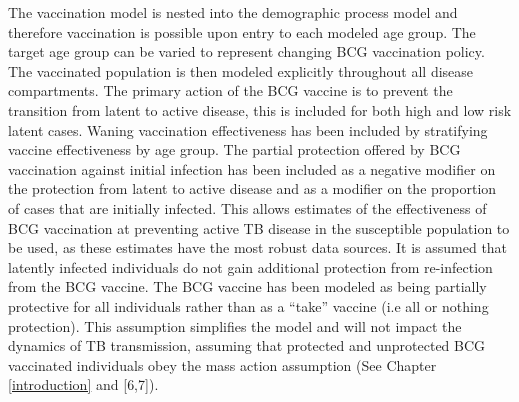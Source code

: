 \documentclass[11pt,twoside]{bristolthesis}
\begin{document}
  The vaccination model is nested into the demographic process model and therefore vaccination is possible upon entry to each modeled age group. The target age group can be varied to represent changing BCG vaccination policy. The vaccinated population is then modeled explicitly throughout all disease compartments. The primary action of the BCG vaccine is to prevent the transition from latent to active disease, this is included for both high and low risk latent cases. Waning vaccination effectiveness has been included by stratifying vaccine effectiveness by age group. The partial protection offered by BCG vaccination against initial infection has been included as a negative modifier on the protection from latent to active disease and as a modifier on the proportion of cases that are initially infected. This allows estimates of the effectiveness of BCG vaccination at preventing active TB disease in the susceptible population to be used, as these estimates have the most robust data sources. It is assumed that latently infected individuals do not gain additional protection from re-infection from the BCG vaccine. The BCG vaccine has been modeled as being partially protective for all individuals rather than as a ``take'' vaccine (i.e all or nothing protection). This assumption simplifies the model and will not impact the dynamics of TB transmission, assuming that protected and unprotected BCG vaccinated individuals obey the mass action assumption (See Chapter \ref{introduction} and {[}6,7{]}).
\end{document}
